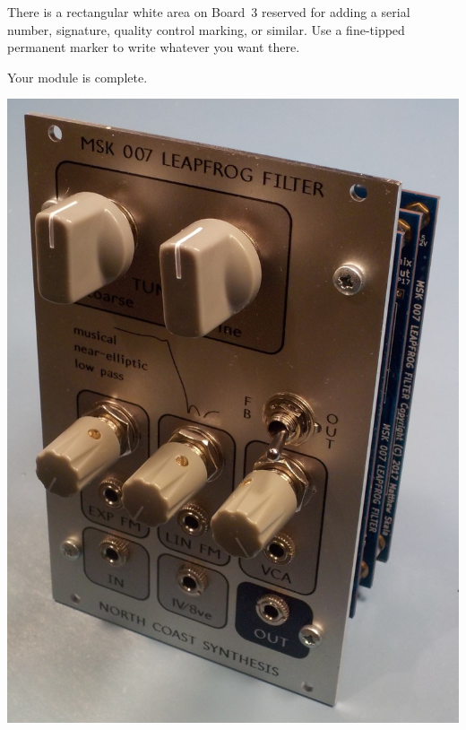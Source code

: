 \pagebreak

There is a rectangular white area on Board~3
reserved for adding a serial number, signature, quality control marking, or
similar.  Use a fine-tipped permanent marker to write whatever you want
there.

Your module is complete.

\nopagebreak
\noindent\includegraphics[width=\linewidth]{finished-module.jpg}
